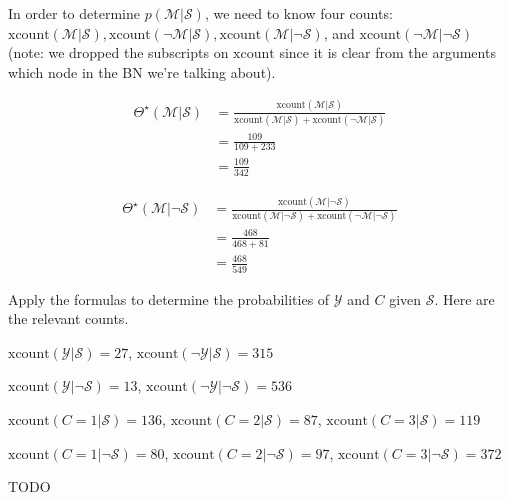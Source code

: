 \documentclass{tufte-handout}
\begin{document}
\item In order to determine $p(\mathcal{M} | \mathcal{S})$, we need to know four counts: $\mbox{xcount}(\mathcal{M}| \mathcal{S}), \mbox{xcount}(\neg \mathcal{M}| \mathcal{S}), \mbox{xcount}(\mathcal{M}|\neg \mathcal{S})$, and $\mbox{xcount}(\neg \mathcal{M}|\neg \mathcal{S})$ (note: we dropped the subscripts on $\mbox{xcount}$ since it is clear from the arguments which node in the BN we're talking about).

\begin{align}
\Theta^\star(\mathcal{M}|  \mathcal{S}) &= \frac{\mbox{xcount}(\mathcal{M}| \mathcal{S})}{\mbox{xcount}(\mathcal{M}| \mathcal{S}) + \mbox{xcount}(\neg \mathcal{M}|  \mathcal{S}) } \nonumber \\
&= \frac{109}{109+233} \nonumber \\
&= \frac{109}{342} \nonumber
\end{align}

\begin{align}
\Theta^\star(\mathcal{M}| \neg \mathcal{S}) &= \frac{\mbox{xcount}(\mathcal{M}| \neg \mathcal{S})}{\mbox{xcount}(\mathcal{M}| \neg \mathcal{S}) + \mbox{xcount}(\neg \mathcal{M}| \neg \mathcal{S}) } \nonumber \\
&= \frac{468}{468+81} \nonumber \\
&= \frac{468}{549} \nonumber
\end{align}

\begin{exercise}
Apply the formulas to determine the probabilities of $\mathcal{Y}$ and $C$ given $\mathcal{S}$.  Here are the relevant counts.

\bi
\item $\mbox{xcount}(\mathcal{Y}|  \mathcal{S}) = 27$,  $\mbox{xcount}(\neg \mathcal{Y}|  \mathcal{S}) = 315$
\item $\mbox{xcount}(\mathcal{Y}| \neg \mathcal{S}) = 13$,  $\mbox{xcount}(\neg \mathcal{Y}| \neg \mathcal{S}) = 536$
\item $\mbox{xcount}(C=1 | \mathcal{S}) = 136$, $\mbox{xcount}(C=2 | \mathcal{S}) = 87$, $\mbox{xcount}(C=3 | \mathcal{S}) = 119$
\item $\mbox{xcount}(C=1 | \neg \mathcal{S}) = 80$, $\mbox{xcount}(C=2 | \neg \mathcal{S}) = 97$, $\mbox{xcount}(C=3 | \neg \mathcal{S}) = 372$
\ei
\begin{boxedsolution}
TODO
\end{boxedsolution}

\end{exercise}
\end{document}

